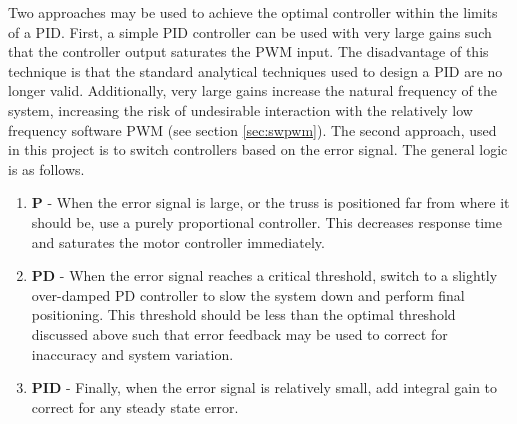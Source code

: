 Two approaches may be used to achieve the optimal controller within the limits of a PID.
First, a simple PID controller can be used with very large gains such that the controller output saturates the PWM input.
The disadvantage of this technique is that the standard analytical techniques used to design a PID are no longer valid. 
Additionally, very large gains increase the natural frequency of the system, increasing the risk of undesirable interaction with the relatively low frequency software PWM (see section \ref{sec:swpwm}).
The second approach, used in this project is to switch controllers based on the error signal. 
The general logic is as follows.

\begin{enumerate}

\item \textbf{P} - 
When the error signal is large, or the truss is positioned far from where it should be, use a purely proportional controller.
This decreases response time and saturates the motor controller immediately. 

\item \textbf{PD} - 
When the error signal reaches a critical threshold, switch to a slightly over-damped PD controller to slow the system down and perform final positioning.
This threshold should be less than the optimal threshold discussed above such that error feedback may be used to correct for inaccuracy and system variation.

\item \textbf{PID} - 
Finally, when the error signal is relatively small, add integral gain to correct for any steady state error.

\end{enumerate}





